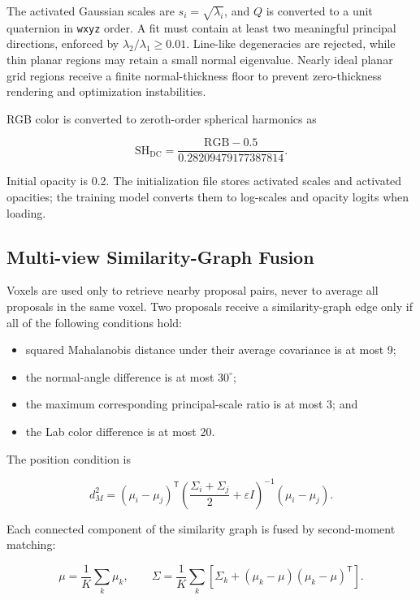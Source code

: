 \documentclass[11pt,a4paper]{article}
\newcommand{\code}[1]{\texttt{#1}}
\begin{document}
The activated Gaussian scales are $s_i=\sqrt{\lambda_i}$, and $Q$ is converted to a unit quaternion in \code{wxyz} order. A fit must contain at least two meaningful principal directions, enforced by $\lambda_2/\lambda_1\ge0.01$. Line-like degeneracies are rejected, while thin planar regions may retain a small normal eigenvalue. Nearly ideal planar grid regions receive a finite normal-thickness floor to prevent zero-thickness rendering and optimization instabilities.

RGB color is converted to zeroth-order spherical harmonics as

\begin{equation}
\mathrm{SH}_{\mathrm{DC}}=\frac{\mathrm{RGB}-0.5}{0.28209479177387814}.
\end{equation}

Initial opacity is 0.2. The initialization file stores activated scales and activated opacities; the training model converts them to log-scales and opacity logits when loading.

\subsection{Multi-view Similarity-Graph Fusion}

Voxels are used only to retrieve nearby proposal pairs, never to average all proposals in the same voxel. Two proposals receive a similarity-graph edge only if all of the following conditions hold:

\begin{itemize}
  \item squared Mahalanobis distance under their average covariance is at most 9;
  \item the normal-angle difference is at most $30^\circ$;
  \item the maximum corresponding principal-scale ratio is at most 3; and
  \item the Lab color difference is at most 20.
\end{itemize}

The position condition is

\begin{equation}
d_M^2=(\mu_i-\mu_j)^\mathsf T
\left(\frac{\Sigma_i+\Sigma_j}{2}+\varepsilon I\right)^{-1}
(\mu_i-\mu_j).
\label{eq:mahalanobis}
\end{equation}

Each connected component of the similarity graph is fused by second-moment matching:

\begin{equation}
\mu=\frac1K\sum_k\mu_k,
\qquad
\Sigma=\frac1K\sum_k
\left[\Sigma_k+(\mu_k-\mu)(\mu_k-\mu)^\mathsf T\right].
\label{eq:moment-fusion}
\end{equation}
\end{document}

